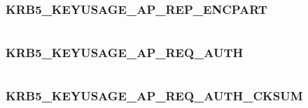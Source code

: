 \documentclass[letterpaper,10pt,english]{sphinxmanual}
\begin{document}
\subsubsection{KRB5\_KEYUSAGE\_AP\_REP\_ENCPART}
\label{appdev/refs/macros/KRB5_KEYUSAGE_AP_REP_ENCPART::doc}\label{appdev/refs/macros/KRB5_KEYUSAGE_AP_REP_ENCPART:krb5-keyusage-ap-rep-encpart}\label{appdev/refs/macros/KRB5_KEYUSAGE_AP_REP_ENCPART:krb5-keyusage-ap-rep-encpart-data}

\begin{fulllineitems}
\label{appdev/refs/macros/KRB5_KEYUSAGE_AP_REP_ENCPART:KRB5_KEYUSAGE_AP_REP_ENCPART}
\end{fulllineitems}


\begin{tabulary}{\linewidth}{|L|L|}
\hline

 & 
\\
\hline\end{tabulary}



\subsubsection{KRB5\_KEYUSAGE\_AP\_REQ\_AUTH}
\label{appdev/refs/macros/KRB5_KEYUSAGE_AP_REQ_AUTH::doc}\label{appdev/refs/macros/KRB5_KEYUSAGE_AP_REQ_AUTH:krb5-keyusage-ap-req-auth}\label{appdev/refs/macros/KRB5_KEYUSAGE_AP_REQ_AUTH:krb5-keyusage-ap-req-auth-data}

\begin{fulllineitems}
\label{appdev/refs/macros/KRB5_KEYUSAGE_AP_REQ_AUTH:KRB5_KEYUSAGE_AP_REQ_AUTH}
\end{fulllineitems}


\begin{tabulary}{\linewidth}{|L|L|}
\hline

 & 
\\
\hline\end{tabulary}



\subsubsection{KRB5\_KEYUSAGE\_AP\_REQ\_AUTH\_CKSUM}
\label{appdev/refs/macros/KRB5_KEYUSAGE_AP_REQ_AUTH_CKSUM:krb5-keyusage-ap-req-auth-cksum-data}\label{appdev/refs/macros/KRB5_KEYUSAGE_AP_REQ_AUTH_CKSUM:krb5-keyusage-ap-req-auth-cksum}\label{appdev/refs/macros/KRB5_KEYUSAGE_AP_REQ_AUTH_CKSUM::doc}
\end{document}

